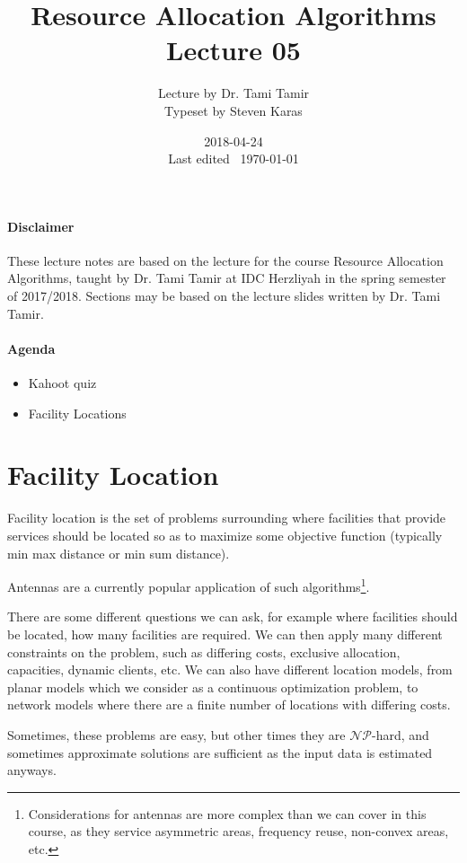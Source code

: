 \documentclass{idc_msc}
\title{Resource Allocation Algorithms\\\large Lecture 05}
\date{2018-04-24 \\ Last edited \currenttime\ \today}
\author{Lecture by Dr. Tami Tamir\\Typeset by Steven Karas}
\newcommand{\NPclass}{\mathcal{NP}}
\begin{document}
\maketitle

\nocite{pinedo2016scheduling}

\paragraph{Disclaimer}

These lecture notes are based on the lecture for the course Resource Allocation Algorithms, taught by Dr. Tami Tamir at IDC Herzliyah in the spring semester of 2017/2018.
Sections may be based on the lecture slides written by Dr. Tami Tamir.

\paragraph{Agenda}

\begin{itemize}
  \item Kahoot quiz
  \item Facility Locations
\end{itemize}

\section{Facility Location}

Facility location is the set of problems surrounding where facilities that provide services should be located so as to maximize some objective function (typically min max distance or min sum distance).

Antennas are a currently popular application of such algorithms\footnote{Considerations for antennas are more complex than we can cover in this course, as they service asymmetric areas, frequency reuse, non-convex areas, etc.}.

There are some different questions we can ask, for example where facilities should be located, how many facilities are required.
We can then apply many different constraints on the problem, such as differing costs, exclusive allocation, capacities, dynamic clients, etc.
We can also have different location models, from planar models which we consider as a continuous optimization problem, to network models where there are a finite number of locations with differing costs.

Sometimes, these problems are easy, but other times they are \(\NPclass\)-hard, and sometimes approximate solutions are sufficient as the input data is estimated anyways.
\end{document}
